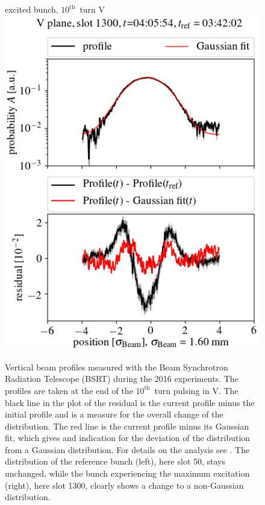\documentclass[%
 reprint,
 amsmath,amssymb,
 aps,
prstab,
]{revtex4-1}
\begin{document}
\begin{figure}[h]
\begin{minipage}[t]{0.49\linewidth}
		excited bunch, $10^{\mathrm{th}}$~turn V		\includegraphics[width=1.0\linewidth]{profile_v10th_slot_1300.png}
	\end{minipage}
	\caption{\label{fig:10thexpprof} Vertical beam profiles measured with the Beam Synchrotron Radiation Telescope (BSRT) during the 2016 experiments. The profiles are taken at the end of the $10^{\mathrm{th}}$~turn pulsing in V. The black line in the plot of the residual is the current profile minus the initial profile and is a measure for the overall change of the distribution. The red line is the current profile minus its Gaussian fit, which gives and indication for the deviation of the distribution from a Gaussian distribution. For details on the analysis see \cite{bsrtprofinj}. The distribution of the reference bunch (left), here slot 50, stays unchanged, while the bunch experiencing the maximum excitation (right), here slot 1300, clearly shows a change to a non-Gaussian distribution.}
\end{figure}
\end{document}
